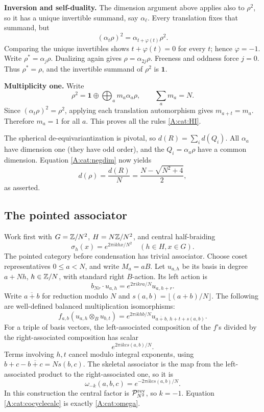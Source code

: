 \documentclass[11pt]{article}
\newcommand{\one}{\mathbf1}\newcommand{\D}{\mathcal D}\newcommand{\Dcat}{\mathcal D}
\numberwithin{equation}{section}
\begin{document}
\textbf{Inversion and self-duality.} The dimension argument above applies also to $\rho^2$, so it has a unique invertible summand, say $\alpha_\ell$. Every translation fixes that summand, but
\[
 (\alpha_t\rho)^2=\alpha_{t+\varphi(t)}\rho^2.
\]
Comparing the unique invertibles shows $t+\varphi(t)=0$ for every $t$; hence $\varphi=-1$. Write $\rho^*=\alpha_j\rho$. Dualizing again gives $\rho=\alpha_{2j}\rho$. Freeness and oddness force $j=0$. Thus $\rho^*=\rho$, and the invertible summand of $\rho^2$ is $\one$.

\textbf{Multiplicity one.} Write
\[
 \rho^2=\one\oplus\bigoplus_a m_a\alpha_a\rho,\qquad\sum_a m_a=N.
\]
Since $(\alpha_t\rho)^2=\rho^2$, applying each translation automorphism gives $m_{a+t}=m_a$. Therefore $m_a=1$ for all $a$. This proves all the rules \eqref{A:cat:HI}.

The spherical de-equivariantization is pivotal, so $d(R)=\sum_i d(Q_i)$. All $\alpha_a$ have dimension one (they have odd order), and the $Q_i=\alpha_a\rho$ have a common dimension. Equation \eqref{A:cat:negdim} now yields
\[
 d(\rho)=\frac{d(R)}N=\frac{N-\sqrt{N^2+4}}2,
\]
as asserted.

\subsection{The pointed associator}\label{A:cat:associator}
Work first with $G=\mathbb Z/N^2$, $H=N\mathbb Z/N^2$, and central half-braiding
\[
 \sigma_h(x)=e^{2\pi i k hx/N^2}\quad(h\in H,x\in G).
\]
The pointed category before condensation has trivial associator. Choose coset representatives $0\leq a<N$, and write $M_a=aB$. Let $u_{a,h}$ be its basis in degree $a+Nh$, $h\in\mathbb Z/N$, with standard right $B$-action. Its left action is
\[
 b_{Nr}\cdot u_{a,h}=e^{2\pi i k ra/N}u_{a,h+r}.
\]
Write $\overline{a+b}$ for reduction modulo $N$ and $s(a,b)=\lfloor(a+b)/N\rfloor$. The following are well-defined balanced multiplication isomorphisms:
\[
 f_{a,b}(u_{a,h}\otimes_B u_{b,t})
 =e^{2\pi i k hb/N}
 u_{\overline{a+b},\,h+t+s(a,b)}.
\]
For a triple of basis vectors, the left-associated composition of the $f$'s divided by the right-associated composition has scalar
\[
 e^{2\pi i k c s(a,b)/N}.
\]
Terms involving $h,t$ cancel modulo integral exponents, using
$b+c-\overline{b+c}=Ns(b,c)$. The skeletal associator is the map from the left-associated product to the right-associated one, so it is
\begin{equation}\label{A:cat:cocyclecalc}
 \omega_{-k}(a,b,c)=e^{-2\pi i k c s(a,b)/N}.
\end{equation}
In this construction the central factor is $\mathcal P_{N^2}^{\mathrm{rev}}$, so $k=-1$. Equation \eqref{A:cat:cocyclecalc} is exactly \eqref{A:cat:omega}.
\end{document}
